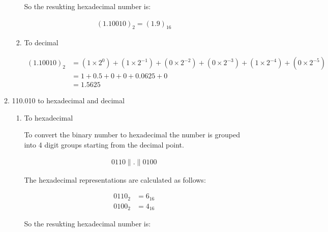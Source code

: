 \documentclass{article}
\begin{document}
\begin{enumerate}[label=\textbf{\arabic*.}]
\begin{enumerate}[label=\textbf{\alph*.}]
\begin{enumerate}[label=\textbf{\roman*.}]
            So the resukting hexadecimal number is: \newline
        
            \begin{align*}
                (1.10010)_2 = (1.9)_{16}
            \end{align*}

            \item To decimal \newline
            
            \begin{align*}
                (1.10010)_2 &= (1 \times 2^0) + (1 \times 2^{-1}) + (0 \times 2^{-2}) + (0 \times 2^{-3}) + (1 \times 2^{-4}) + (0 \times 2^{-5}) \\
                &= 1 + 0.5 + 0 + 0 + 0.0625 + 0 \\
                &= 1.5625   
            \end{align*}

        \end{enumerate}

        \item 110.010 to hexadecimal and decimal \newline
        
        \begin{enumerate}[label=\textbf{\roman*.}]
            \item To hexadecimal \newline
            
            To convert the binary number to hexadecimal the number is grouped into 4 digit groups starting from the decimal point. \newline

            \begin{align*}
                0110 \parallel . \parallel 0100
            \end{align*}

            The hexadecimal representations are calculated as follows: \newline

            \begin{align*}
                0110_2 &= 6_{16} \\
                0100_2 &= 4_{16}
            \end{align*}

            So the resukting hexadecimal number is: \newline


\end{enumerate}
\end{enumerate}
\end{enumerate}
\end{document}
